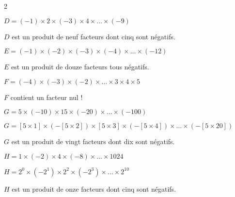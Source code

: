 \begin{corrige}
    \phantom{rrr}
    \begin{multicols}2
    \begin{list}{}{}
        \item $D = (-1)\times 2\times (-3)\times 4\times\ldots \times (-9) $
        
        $D$ est un produit de neuf facteurs dont cinq sont négatifs.
        

        \medskip
        \item $E = (-1)\times(-2)\times(-3)\times(-4)\times\ldots\times (-12) $
        
        $E$ est un produit de douze facteurs tous négatifs.

        \item
        \item $F = (-4)\times(-3)\times(-2)\times\ldots\times 3\times 4\times 5$
        
        $F$ contient un facteur nul ! 

        \medskip
        \item $G = 5\times (-10)\times 15\times (-20)\times\ldots\times (-100)$
        
        $G = [5\times 1]\times (-[5\times 2])\times [5\times 3]\times (-[5\times 4])\times\ldots\times (-[5\times 20])$

        $G$ est un produit de vingt facteurs dont dix sont négatifs.

        \medskip
        \item $H = 1\times (-2)\times 4\times (-8)\times\ldots\times \num{1024}$
        
        $H = 2^0\times (-2^1)\times 2^2\times (-2^3)\times\ldots\times 2^{10}$

        $H$ est un produit de onze facteurs dont cinq sont négatifs.

    \end{list}
\end{multicols}
\end{corrige}

